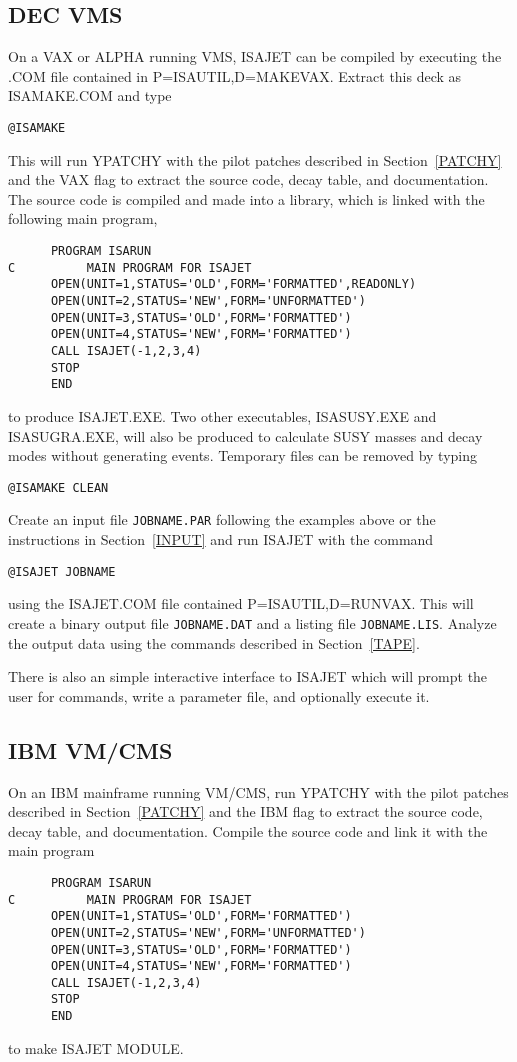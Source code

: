 \subsection{DEC VMS}

      On a VAX or ALPHA running VMS, ISAJET can be compiled by
executing the .COM file contained in P=ISAUTIL,D=MAKEVAX. Extract this
deck as ISAMAKE.COM and type
\begin{verbatim}
@ISAMAKE
\end{verbatim}
This will run YPATCHY with the pilot patches described in
Section~\ref{PATCHY} and the VAX flag to extract the source code,
decay table, and documentation. The source code is compiled and made
into a library, which is linked with the following main program,
\begin{verbatim}
      PROGRAM ISARUN
C          MAIN PROGRAM FOR ISAJET
      OPEN(UNIT=1,STATUS='OLD',FORM='FORMATTED',READONLY)
      OPEN(UNIT=2,STATUS='NEW',FORM='UNFORMATTED')
      OPEN(UNIT=3,STATUS='OLD',FORM='FORMATTED')
      OPEN(UNIT=4,STATUS='NEW',FORM='FORMATTED')
      CALL ISAJET(-1,2,3,4)
      STOP
      END
\end{verbatim}
to produce ISAJET.EXE. Two other executables, ISASUSY.EXE and
ISASUGRA.EXE, will also be produced to calculate SUSY masses and decay
modes without generating events. Temporary files can be removed by
typing
\begin{verbatim}
@ISAMAKE CLEAN
\end{verbatim}

      Create an input file \verb|JOBNAME.PAR| following the examples
above or the instructions in Section~\ref{INPUT} and run ISAJET with
the command
\begin{verbatim}
@ISAJET JOBNAME
\end{verbatim}
using the ISAJET.COM file contained P=ISAUTIL,D=RUNVAX. This will
create a binary output file \verb|JOBNAME.DAT| and a listing file
\verb|JOBNAME.LIS|. Analyze the output data using the commands
described in Section~\ref{TAPE}.

      There is also an simple interactive interface to ISAJET which
will prompt the user for commands, write a parameter file, and
optionally execute it.

\subsection{IBM VM/CMS}

      On an IBM mainframe running VM/CMS, run YPATCHY with the pilot
patches described in Section~\ref{PATCHY} and the IBM flag to extract
the source code, decay table, and documentation. Compile the source
code and link it with the main program
\begin{verbatim}
      PROGRAM ISARUN
C          MAIN PROGRAM FOR ISAJET
      OPEN(UNIT=1,STATUS='OLD',FORM='FORMATTED')
      OPEN(UNIT=2,STATUS='NEW',FORM='UNFORMATTED')
      OPEN(UNIT=3,STATUS='OLD',FORM='FORMATTED')
      OPEN(UNIT=4,STATUS='NEW',FORM='FORMATTED')
      CALL ISAJET(-1,2,3,4)
      STOP
      END
\end{verbatim}
to make ISAJET MODULE.

